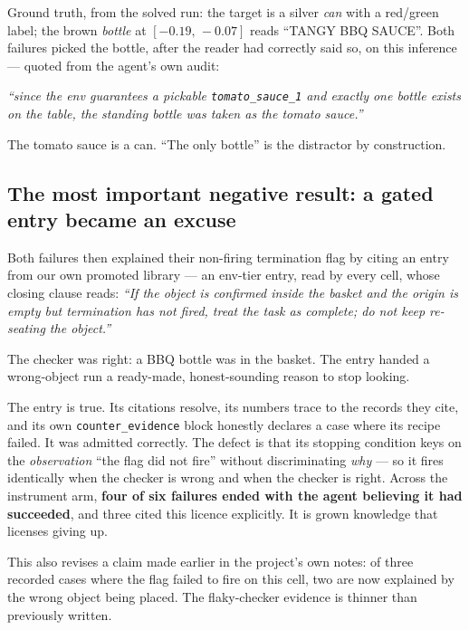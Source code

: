 \documentclass[11pt,a4paper]{article}
\begin{document}
Ground truth, from the solved run: the target is a silver \emph{can} with a
red/green label; the brown \emph{bottle} at $[-0.19,\,-0.07]$ reads ``TANGY BBQ
SAUCE''. Both failures picked the bottle, after the reader had correctly said
so, on this inference --- quoted from the agent's own audit:

\begin{evidence}[title={The failing inference, verbatim}]
\small\itshape
``since the env guarantees a pickable \texttt{tomato\_sauce\_1} and exactly one bottle
exists on the table, the standing bottle was taken as the tomato sauce.''
\end{evidence}

\noindent
The tomato sauce is a can. ``The only bottle'' is the distractor by
construction.

\subsection{The most important negative result: a gated entry became an excuse}

Both failures then explained their non-firing termination flag by citing an
entry from our own promoted library --- an env-tier entry, read by every cell,
whose closing clause reads: \emph{``If the object is confirmed inside the basket
and the origin is empty but termination has not fired, treat the task as
complete; do not keep re-seating the object.''}

The checker was right: a BBQ bottle was in the basket. The entry handed a
wrong-object run a ready-made, honest-sounding reason to stop looking.

\begin{caution}[title={Why no gate check could have caught this}]
The entry is true. Its citations resolve, its numbers trace to the records they
cite, and its own \texttt{counter\_evidence} block honestly declares a case where
its recipe failed. It was admitted correctly. The defect is that its stopping
condition keys on the \emph{observation} ``the flag did not fire'' without
discriminating \emph{why} --- so it fires identically when the checker is wrong
and when the checker is right. Across the instrument arm, \textbf{four of six
failures ended with the agent believing it had succeeded}, and three cited this
licence explicitly. It is grown knowledge that licenses giving up.
\end{caution}

\noindent
This also revises a claim made earlier in the project's own notes: of three
recorded cases where the flag failed to fire on this cell, two are now explained
by the wrong object being placed. The flaky-checker evidence is thinner than
previously written.
\end{document}
